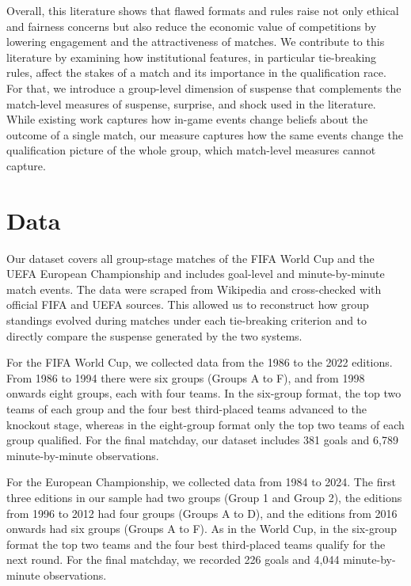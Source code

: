 \documentclass[11pt]{article}
\begin{document}
Overall, this literature shows that flawed formats and rules raise not only ethical and fairness concerns but also reduce the economic value of competitions by lowering engagement and the attractiveness of matches. We contribute to this literature by examining how institutional features, in particular tie-breaking rules, affect the stakes of a match and its importance in the qualification race. For that, we introduce a group-level dimension of suspense that complements the match-level measures of suspense, surprise, and shock used in the literature. While existing work captures how in-game events change beliefs about the outcome of a single match, our measure captures how the same events change the qualification picture of the whole group, which match-level measures cannot capture.



\section{Data}
\label{sec:data}

Our dataset covers all group-stage matches of the FIFA World Cup and the UEFA European Championship and includes goal-level and minute-by-minute match events. The data were scraped from Wikipedia and cross-checked with official FIFA and UEFA sources. This allowed us to reconstruct how group standings evolved during matches under each tie-breaking criterion and to directly compare the suspense generated by the two systems.

For the FIFA World Cup, we collected data from the 1986 to the 2022 editions. From 1986 to 1994 there were six groups (Groups A to F), and from 1998 onwards eight groups, each with four teams. In the six-group format, the top two teams of each group and the four best third-placed teams advanced to the knockout stage, whereas in the eight-group format only the top two teams of each group qualified. For the final matchday, our dataset includes 381 goals and 6{,}789 minute-by-minute observations.

For the European Championship, we collected data from 1984 to 2024. The first three editions in our sample had two groups (Group 1 and Group 2), the editions from 1996 to 2012 had four groups (Groups A to D), and the editions from 2016 onwards had six groups (Groups A to F). As in the World Cup, in the six-group format the top two teams and the four best third-placed teams qualify for the next round. For the final matchday, we recorded 226 goals and 4{,}044 minute-by-minute observations.
\end{document}

